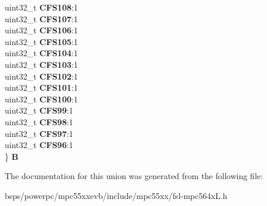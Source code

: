 \begin{DoxyCompactItemize}
\begin{tabbing}
\>uint32\_t {\bfseries CFS108}:1\\
\>uint32\_t {\bfseries CFS107}:1\\
\>uint32\_t {\bfseries CFS106}:1\\
\>uint32\_t {\bfseries CFS105}:1\\
\>uint32\_t {\bfseries CFS104}:1\\
\>uint32\_t {\bfseries CFS103}:1\\
\>uint32\_t {\bfseries CFS102}:1\\
\>uint32\_t {\bfseries CFS101}:1\\
\>uint32\_t {\bfseries CFS100}:1\\
\>uint32\_t {\bfseries CFS99}:1\\
\>uint32\_t {\bfseries CFS98}:1\\
\>uint32\_t {\bfseries CFS97}:1\\
\>uint32\_t {\bfseries CFS96}:1\\
\} {\bfseries B}\\

\end{tabbing}\end{DoxyCompactItemize}


The documentation for this union was generated from the following file\+:\begin{DoxyCompactItemize}
\item 
bsps/powerpc/mpc55xxevb/include/mpc55xx/fsl-\/mpc564x\+L.\+h\end{DoxyCompactItemize}
